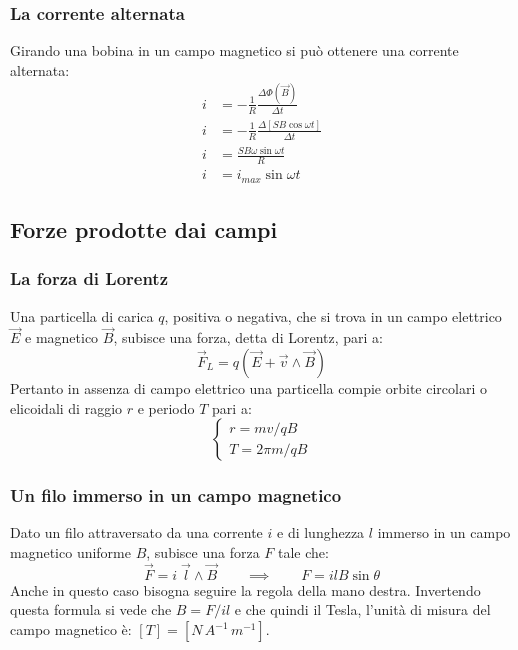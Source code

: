 \documentclass{article}
\begin{document}
\subsubsection{La corrente alternata}
Girando una bobina in un campo magnetico si può ottenere una corrente alternata:
\begin{align*}
    i&=-\frac{1}{R}\frac{\Delta \Phi (\Vec{B})}{\Delta t}\\
    i&=-\frac{1}{R}\frac{\Delta [SB\cos{\omega t}]}{\Delta t}\\
    i&=\frac{SB\omega\sin{\omega t}}{R}\\
    i&=i_{max} \sin{\omega t}
\end{align*}


\subsection{Forze prodotte dai campi}
\subsubsection{La forza di Lorentz}
Una particella di carica $q$, positiva o negativa, che si trova in un campo elettrico $\vec{E}$ e magnetico $\Vec{B}$, subisce una forza, detta di Lorentz, pari a:
\begin{equation}
    \Vec{F}_L=q(\vec{E}+\vec{v}\wedge \Vec{B})
\end{equation}
Pertanto in assenza di campo elettrico una particella compie orbite circolari o elicoidali di raggio $r$ e periodo $T$ pari a:
\begin{equation}
    \begin{cases}
        r=mv/qB\\
        T=2\pi m/qB
    \end{cases}
\end{equation}

\subsubsection{Un filo immerso in un campo magnetico}
Dato un filo attraversato da una corrente $i$ e di lunghezza $l$ immerso in un campo magnetico uniforme $B$, subisce una forza $F$ tale che:
\begin{equation}
    \vec{F}=i\; \Vec{l} \wedge \Vec{B} \qquad \implies \qquad F=ilB\sin{\theta}
\end{equation}
Anche in questo caso bisogna seguire la regola della mano destra. 
Invertendo questa formula si vede che $B=F/il$ e che quindi il Tesla, l'unità di misura del campo magnetico è: $[T]=[N\,A^{-1}\,m^{-1}]$.
\end{document}
